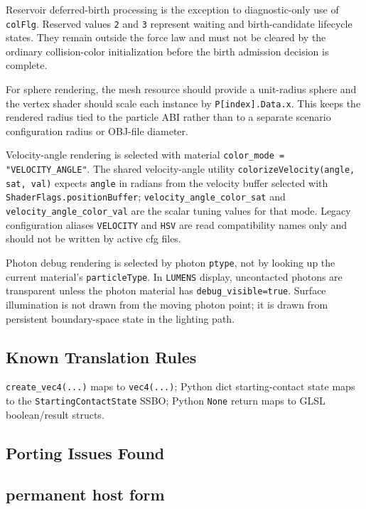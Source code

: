 Reservoir deferred-birth processing is the exception to diagnostic-only use of
\texttt{colFlg}.  Reserved values \texttt{2} and \texttt{3} represent waiting
and birth-candidate lifecycle states.  They remain outside the force law and
must not be cleared by the ordinary collision-color initialization before the
birth admission decision is complete.

For sphere rendering, the mesh resource should provide a unit-radius sphere
and the vertex shader should scale each instance by \texttt{P[index].Data.x}.
This keeps the rendered radius tied to the particle ABI rather than to a
separate scenario configuration radius or OBJ-file diameter.

Velocity-angle rendering is selected with material
\texttt{color\_mode = "VELOCITY\_ANGLE"}.  The shared velocity-angle utility
\texttt{colorizeVelocity(angle, sat, val)} expects \texttt{angle} in radians
from the velocity buffer selected with \texttt{ShaderFlags.positionBuffer};
\texttt{velocity\_angle\_color\_sat} and
\texttt{velocity\_angle\_color\_val} are the scalar tuning values for that
mode.  Legacy configuration aliases \texttt{VELOCITY} and \texttt{HSV} are
read compatibility names only and should not be written by active cfg files.

Photon debug rendering is selected by photon \texttt{ptype}, not by looking
up the current material's \texttt{particleType}.  In \texttt{LUMENS} display,
uncontacted photons are transparent unless the photon material has
\texttt{debug\_visible=true}.  Surface illumination is not drawn from the
moving photon point; it is drawn from persistent boundary-space state in the
lighting path.

\subsection{Known Translation Rules}

\texttt{create\_vec4(...)} maps to \texttt{vec4(...)}; Python dict
starting-contact state maps to the \texttt{StartingContactState} SSBO; Python
\texttt{None} return maps to GLSL boolean/result structs.

\subsection{Porting Issues Found}

\subsection{permanent host form}

